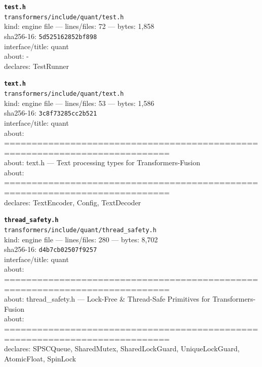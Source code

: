 \noindent\textbf{\texttt{test.h}}\\
\texttt{transformers/include/quant/test.h}\\
kind: engine file --- lines/files: 72 --- bytes: 1,858\\
sha256-16: \texttt{5d525162852bf898}\\
interface/title: quant\\
about: -\\
declares: TestRunner\\
\vspace*{6.0pt}

\noindent\textbf{\texttt{text.h}}\\
\texttt{transformers/include/quant/text.h}\\
kind: engine file --- lines/files: 53 --- bytes: 1,586\\
sha256-16: \texttt{3c8f73285cc2b521}\\
interface/title: quant\\
about: ============================================================================\\
about: text.h — Text processing types for Transformers-Fusion\\
about: ============================================================================\\
declares: TextEncoder, Config, TextDecoder\\
\vspace*{6.0pt}
\newpage

\noindent\textbf{\texttt{thread\_safety.h}}\\
\texttt{transformers/include/quant/thread\_safety.h}\\
kind: engine file --- lines/files: 280 --- bytes: 8,702\\
sha256-16: \texttt{d4b7cb02507f9257}\\
interface/title: quant\\
about: ============================================================================\\
about: thread\_safety.h — Lock-Free \& Thread-Safe Primitives for Transformers-Fusion\\
about: ============================================================================\\
declares: SPSCQueue, SharedMutex, SharedLockGuard, UniqueLockGuard, AtomicFloat, SpinLock\\
\vspace*{6.0pt}

